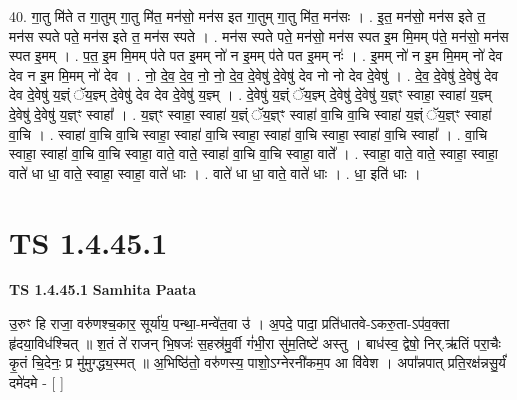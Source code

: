 \documentclass[17pt]{extarticle}
\begin{document}
40. गा॒तु मि॑ते त गा॒तुम् गा॒तु मि॑त॒ मन॑सो॒ मन॑स इत गा॒तुम् गा॒तु मि॑त॒ मन॑सः । . इ॒त॒ मन॑सो॒ मन॑स इते त॒ मन॑स स्पते पते॒ मन॑स इते त॒ मन॑स स्पते । . मन॑स स्पते पते॒ मन॑सो॒ मन॑स स्पत इ॒म मि॒मम् प॑ते॒ मन॑सो॒ मन॑स स्पत इ॒मम् । . प॒त॒ इ॒म मि॒मम् प॑ते पत इ॒मम् नो॑ न इ॒मम् प॑ते पत इ॒मम् नः॑ । . इ॒मम् नो॑ न इ॒म मि॒मम् नो॑ देव देव न इ॒म मि॒मम् नो॑ देव । . नो॒ दे॒व॒ दे॒व॒ नो॒ नो॒ दे॒व॒ दे॒वेषु॑ दे॒वेषु॑ देव नो नो देव दे॒वेषु॑ । . दे॒व॒ दे॒वेषु॑ दे॒वेषु॑ देव देव दे॒वेषु॑ य॒ज्ञ्ं ॅय॒ज्ञ्म् दे॒वेषु॑ देव देव दे॒वेषु॑ य॒ज्ञ्म् । . दे॒वेषु॑ य॒ज्ञ्ं ॅय॒ज्ञ्म् दे॒वेषु॑ दे॒वेषु॑ य॒ज्ञ्ꣳ स्वाहा॒ स्वाहा॑ य॒ज्ञ्म् दे॒वेषु॑ दे॒वेषु॑ य॒ज्ञ्ꣳ स्वाहा᳚ । . य॒ज्ञ्ꣳ स्वाहा॒ स्वाहा॑ य॒ज्ञ्ं ॅय॒ज्ञ्ꣳ स्वाहा॑ वा॒चि वा॒चि स्वाहा॑ य॒ज्ञ्ं ॅय॒ज्ञ्ꣳ स्वाहा॑ वा॒चि । . स्वाहा॑ वा॒चि वा॒चि स्वाहा॒ स्वाहा॑ वा॒चि स्वाहा॒ स्वाहा॑ वा॒चि स्वाहा॒ स्वाहा॑ वा॒चि स्वाहा᳚ । . वा॒चि स्वाहा॒ स्वाहा॑ वा॒चि वा॒चि स्वाहा॒ वाते॒ वाते॒ स्वाहा॑ वा॒चि वा॒चि स्वाहा॒ वाते᳚ । . स्वाहा॒ वाते॒ वाते॒ स्वाहा॒ स्वाहा॒ वाते॑ धा धा॒ वाते॒ स्वाहा॒ स्वाहा॒ वाते॑ धाः । . वाते॑ धा धा॒ वाते॒ वाते॑ धाः । . धा॒ इति॑ धाः । \newline
\pagebreak
{}
\section*{ TS 1.4.45.1 }

\textbf{TS 1.4.45.1 } \newline
\textbf{Samhita Paata} \newline

उ॒रुꣳ हि राजा॒ वरु॑णश्च॒कार॒ सूर्या॑य॒ पन्था॒-मन्वे॑त॒वा उ॑ । अ॒पदे॒ पादा॒ प्रति॑धातवे-ऽकरु॒ता-ऽप॑व॒क्ता हृ॑दया॒विध॑श्चित् ॥ श॒तं ते॑ राजन् भि॒षजः॑ स॒हस्र॑मु॒र्वी गं॑भी॒रा सु॑म॒तिष्टे॑ अस्तु । बाध॑स्व॒ द्वेषो॒ निर्.ऋ॑तिं परा॒चैः कृ॒तं चि॒देनः॒ प्र मु॑मुग्द्ध्य॒स्मत् ॥ अ॒भिष्ठि॑तो॒ वरु॑णस्य॒ पाशो॒ऽग्नेरनी॑कम॒प आ वि॑वेश । अपा᳚न्नपात् प्रति॒रक्ष॑न्नसु॒र्यं॑ दमे॑दमे - [ ] \newline
\end{document}
